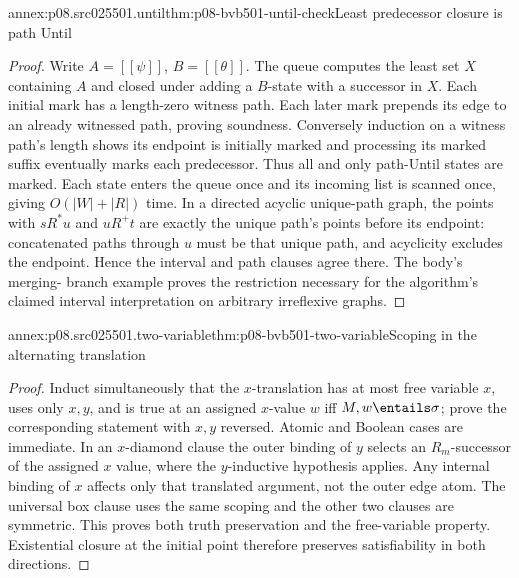 \begin{annexitem}{annex:p08.src025501.until}{thm:p08-bvb501-until-check}{Least predecessor closure is path Until}
\begin{proof}
Write \(A=[\![\psi]\!]\), \(B=[\![\theta]\!]\).
The queue computes the least set \(X\) containing \(A\) and
closed under adding a \(B\)-state with a successor in \(X\).
Each initial mark has a length-zero witness path. Each later mark
prepends its edge to an already witnessed path, proving soundness.
Conversely induction on a witness path's length shows its endpoint is
initially marked and processing its marked suffix eventually marks
each predecessor. Thus all and only path-Until states are marked.
Each state enters the queue once and its incoming list is scanned once,
giving \(O(|W|+|R|)\) time. In a directed acyclic unique-path
graph, the points with \(sR^*u\) and \(uR^+t\) are exactly
the unique path's points before its endpoint: concatenated paths through
\(u\) must be that unique path, and acyclicity excludes the endpoint.
Hence the interval and path clauses agree there. The body's merging-
branch example proves the restriction necessary for the algorithm's
claimed interval interpretation on arbitrary irreflexive graphs.
\end{proof}
\end{annexitem}

\begin{annexitem}{annex:p08.src025501.two-variable}{thm:p08-bvb501-two-variable}{Scoping in the alternating translation}
\begin{proof}
Induct simultaneously that the \(x\)-translation has at most free
variable \(x\), uses only \(x,y\), and is true at an assigned
\(x\)-value \(w\) iff \(M,w\entails\sigma\); prove the
corresponding statement with \(x,y\) reversed. Atomic and Boolean
cases are immediate. In an \(x\)-diamond clause the outer binding
of \(y\) selects an \(R_m\)-successor of the assigned \(x\)
value, where the \(y\)-inductive hypothesis applies. Any internal
binding of \(x\) affects only that translated argument, not the
outer edge atom. The universal box clause uses the same scoping and
the other two clauses are symmetric. This proves both truth preservation
and the free-variable property. Existential closure at the initial point
therefore preserves satisfiability in both directions.
\end{proof}
\end{annexitem}

